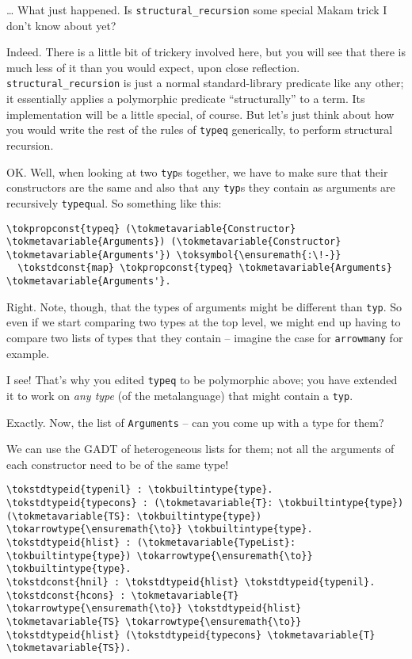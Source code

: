\importantCodeblockEnd{}

\heroSTUDENT{} \ldots{} What just happened. Is \texttt{structural\_recursion}
some special Makam trick I don't know about yet?

\heroADVISOR{} Indeed. There is a little bit of trickery involved here, but
you will see that there is much less of it than you would expect, upon
close reflection. \texttt{structural\_recursion} is just a normal
standard-library predicate like any other; it essentially applies a
polymorphic predicate ``structurally'' to a term. Its implementation
will be a little special, of course. But let's just think about how you
would write the rest of the rules of \texttt{typeq} generically, to
perform structural recursion.

\heroSTUDENT{} OK. Well, when looking at two \texttt{typ}s together, we have
to make sure that their constructors are the same and also that any
\texttt{typ}s they contain as arguments are recursively
\texttt{typeq}ual. So something like this:

\begin{verbatim}
\tokpropconst{typeq} (\tokmetavariable{Constructor} \tokmetavariable{Arguments}) (\tokmetavariable{Constructor} \tokmetavariable{Arguments'}) \toksymbol{\ensuremath{:\!-}}
  \tokstdconst{map} \tokpropconst{typeq} \tokmetavariable{Arguments} \tokmetavariable{Arguments'}.
\end{verbatim}

\heroADVISOR{} Right. Note, though, that the types of arguments might be
different than \texttt{typ}. So even if we start comparing two types at
the top level, we might end up having to compare two lists of types that
they contain -- imagine the case for \texttt{arrowmany} for example.

\heroSTUDENT{} I see! That's why you edited \texttt{typeq} to be polymorphic
above; you have extended it to work on \emph{any type} (of the
metalanguage) that might contain a \texttt{typ}.

\heroADVISOR{} Exactly. Now, the list of \texttt{Arguments} -- can you come up
with a type for them?

\heroSTUDENT{} We can use the GADT of heterogeneous lists for them; not all
the arguments of each constructor need to be of the same type!

\begin{verbatim}
\tokstdtypeid{typenil} : \tokbuiltintype{type}. \tokstdtypeid{typecons} : (\tokmetavariable{T}: \tokbuiltintype{type}) (\tokmetavariable{TS}: \tokbuiltintype{type}) \tokarrowtype{\ensuremath{\to}} \tokbuiltintype{type}.
\tokstdtypeid{hlist} : (\tokmetavariable{TypeList}: \tokbuiltintype{type}) \tokarrowtype{\ensuremath{\to}} \tokbuiltintype{type}.
\tokstdconst{hnil} : \tokstdtypeid{hlist} \tokstdtypeid{typenil}. \tokstdconst{hcons} : \tokmetavariable{T} \tokarrowtype{\ensuremath{\to}} \tokstdtypeid{hlist} \tokmetavariable{TS} \tokarrowtype{\ensuremath{\to}} \tokstdtypeid{hlist} (\tokstdtypeid{typecons} \tokmetavariable{T} \tokmetavariable{TS}).
\end{verbatim}

